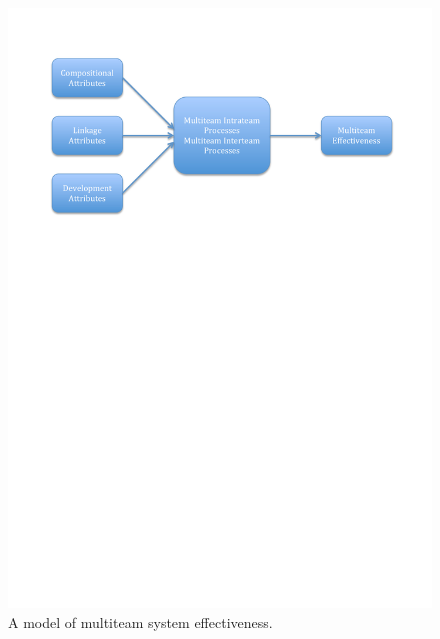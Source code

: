 \begin{figure}
\centering
\includegraphics[trim = 15mm 190mm 15mm 10mm, width=150mm]{images/multiteam_system_model.pdf}
\caption{A model of multiteam system effectiveness.}
\label{amomse}
\end{figure}


